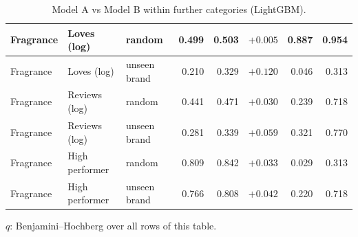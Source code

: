 \begin{table}[htbp]
\begin{tabular}{|l|l|l|r|r|r|r|r|}
\hline
Fragrance & Loves (log) & random & 0.499 & 0.503 & $+0.005$ & 0.887 & 0.954 \\
\hline
Fragrance & Loves (log) & unseen brand & 0.210 & 0.329 & $+0.120$ & 0.046 & 0.313 \\
\hline
Fragrance & Reviews (log) & random & 0.441 & 0.471 & $+0.030$ & 0.239 & 0.718 \\
\hline
Fragrance & Reviews (log) & unseen brand & 0.281 & 0.339 & $+0.059$ & 0.321 & 0.770 \\
\hline
Fragrance & High performer & random & 0.809 & 0.842 & $+0.033$ & 0.029 & 0.313 \\
\hline
Fragrance & High performer & unseen brand & 0.766 & 0.808 & $+0.042$ & 0.220 & 0.718 \\
\hline
\end{tabular}
\par\smallskip
\parbox{0.95\linewidth}{\footnotesize $q$: Benjamini--Hochberg over all rows of this table.}
\caption{Model A vs Model B within further categories (LightGBM).}
\label{tab:categories}
\end{table}

